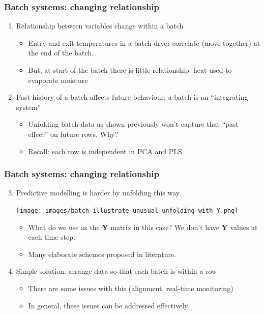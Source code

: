\begin{frame}\frametitle{Batch systems: changing relationship}

\begin{enumerate}
	\item Relationship between variables change within a batch 
			\begin{itemize}
				\item 	Entry and exit temperatures in a batch dryer correlate (move together) at the end of the batch. 
				\item 	But, at start of the batch there is little relationship: heat used to evaporate moisture	
			\end{itemize}

	\pause
	
	\item Past history of a batch affects future behaviour: a batch is an ``integrating system''
	
			\begin{itemize}
				\item 	Unfolding batch data as shown previously won't capture that ``past effect'' on future rows.  Why?
				
				\pause
				
				\item  	Recall: each row is independent in PCA and PLS
			\end{itemize}

\end{enumerate}
\end{frame}

\begin{frame}\frametitle{Batch systems: changing relationship}
\begin{enumerate}
	\setcounter{enumi}{2}
	\item 	Predictive modelling is harder by unfolding this way

			\begin{center}
				\texttt{[image: images/batch-illustrate-unusual-unfolding-with-Y.png]}
			\end{center}
			
		
			\begin{itemize}
				\item 	What do we use as the \( \mathbf{Y} \) matrix in this case? {\scriptsize We don't have  \( \mathbf{Y} \) values at each time step.}
				\item 	Many elaborate schemes proposed in literature.			
			\end{itemize}
		
	\item 	Simple solution: arrange data so that each batch is within a row
	
			\begin{itemize}
				\item 	There are some issues with this  (alignment, real-time monitoring)
				\item 	In general, these issues can be addressed effectively
			\end{itemize}
\end{enumerate}
\end{frame}

